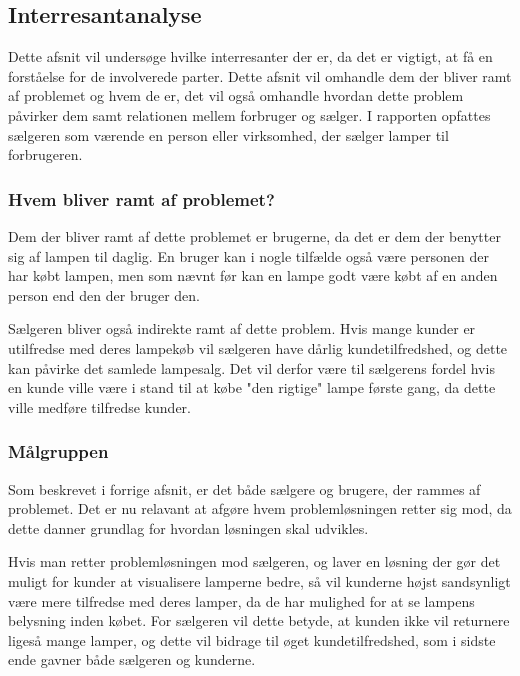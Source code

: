 \subsection{Interresantanalyse}

 Dette afsnit vil undersøge hvilke interresanter der er, da det er vigtigt, at få en forståelse for de involverede parter. Dette afsnit vil omhandle dem der bliver ramt af problemet og hvem de er, det vil også omhandle hvordan dette problem påvirker dem samt relationen mellem forbruger og sælger. I rapporten opfattes sælgeren som værende en person eller virksomhed, der sælger lamper til forbrugeren. 

\subsubsection{Hvem bliver ramt af problemet?}
Dem der bliver ramt af dette problemet er brugerne, da det er dem der benytter sig af lampen til daglig. En bruger kan i nogle tilfælde også være personen der har købt lampen, men som nævnt før kan en lampe godt være købt af en anden person end den der bruger den.

Sælgeren bliver også indirekte ramt af dette problem. Hvis mange kunder er utilfredse med deres lampekøb vil sælgeren have dårlig kundetilfredshed, og dette kan påvirke det samlede lampesalg. Det vil derfor være til sælgerens fordel hvis en kunde ville være i stand til at købe "den rigtige" lampe første gang, da dette ville medføre tilfredse kunder.

 
\subsubsection{Målgruppen}
Som beskrevet i forrige afsnit, er det både sælgere og brugere, der rammes af problemet. Det er nu relavant at afgøre hvem problemløsningen retter sig mod, da dette danner grundlag for hvordan løsningen skal udvikles. 

Hvis man retter problemløsningen mod sælgeren, og laver en løsning der gør det muligt for kunder at visualisere lamperne bedre, så vil kunderne højst sandsynligt være mere tilfredse med deres lamper, da de har mulighed for at se lampens belysning inden købet. For sælgeren vil dette betyde, at kunden ikke vil returnere ligeså mange lamper, og dette vil bidrage til øget kundetilfredshed, som i sidste ende gavner både sælgeren og kunderne.

